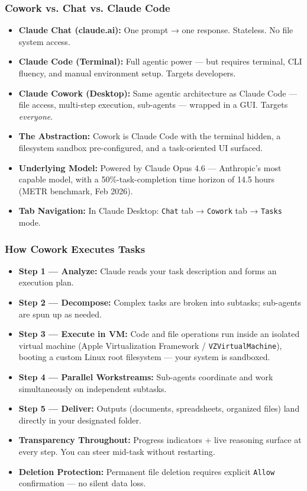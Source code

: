 \begin{frame}[fragile]\frametitle{Cowork vs. Chat vs. Claude Code}
  \begin{itemize}
    \item \textbf{Claude Chat (claude.ai):} One prompt → one response. Stateless. No file system access. 
    \item \textbf{Claude Code (Terminal):} Full agentic power — but requires terminal, CLI fluency, and manual environment setup. Targets developers.
    \item \textbf{Claude Cowork (Desktop):} Same agentic architecture as Claude Code — file access, multi-step execution, sub-agents — wrapped in a GUI. Targets \textit{everyone}.
    \item \textbf{The Abstraction:} Cowork is Claude Code with the terminal hidden, a filesystem sandbox pre-configured, and a task-oriented UI surfaced.
    \item \textbf{Underlying Model:} Powered by Claude Opus 4.6 — Anthropic's most capable model, with a 50\%-task-completion time horizon of 14.5 hours (METR benchmark, Feb 2026).
    \item \textbf{Tab Navigation:} In Claude Desktop: \texttt{Chat} tab → \texttt{Cowork} tab → \texttt{Tasks} mode.
  \end{itemize}
\end{frame}

\begin{frame}[fragile]\frametitle{How Cowork Executes Tasks}
  \begin{itemize}
    \item \textbf{Step 1 — Analyze:} Claude reads your task description and forms an execution plan.
    \item \textbf{Step 2 — Decompose:} Complex tasks are broken into subtasks; sub-agents are spun up as needed.
    \item \textbf{Step 3 — Execute in VM:} Code and file operations run inside an isolated virtual machine (Apple Virtualization Framework / \texttt{VZVirtualMachine}), booting a custom Linux root filesystem — your system is sandboxed.
    \item \textbf{Step 4 — Parallel Workstreams:} Sub-agents coordinate and work simultaneously on independent subtasks.
    \item \textbf{Step 5 — Deliver:} Outputs (documents, spreadsheets, organized files) land directly in your designated folder.
    \item \textbf{Transparency Throughout:} Progress indicators + live reasoning surface at every step. You can steer mid-task without restarting.
    \item \textbf{Deletion Protection:} Permanent file deletion requires explicit \texttt{Allow} confirmation — no silent data loss.
  \end{itemize}
\end{frame}

